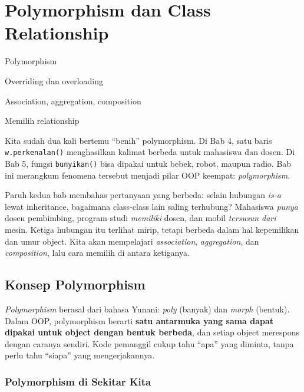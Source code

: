 \chapter{Polymorphism dan Class Relationship}

\begin{dibabini}
  \item Polymorphism
  \item Overriding dan overloading
  \item Association, aggregation, composition
  \item Memilih relationship
\end{dibabini}

Kita sudah dua kali bertemu ``benih'' polymorphism. Di Bab 4, satu baris \texttt{w.perkenalan()} menghasilkan kalimat berbeda untuk mahasiswa dan dosen. Di Bab 5, fungsi \texttt{bunyikan()} bisa dipakai untuk bebek, robot, maupun radio. Bab ini merangkum fenomena tersebut menjadi pilar OOP keempat: \emph{polymorphism}.

Paruh kedua bab membahas pertanyaan yang berbeda: selain hubungan \emph{is-a} lewat inheritance, bagaimana class-class lain saling terhubung? Mahasiswa \emph{punya} dosen pembimbing, program studi \emph{memiliki} dosen, dan mobil \emph{tersusun dari} mesin. Ketiga hubungan itu terlihat mirip, tetapi berbeda dalam hal kepemilikan dan umur object. Kita akan mempelajari \emph{association}, \emph{aggregation}, dan \emph{composition}, lalu cara memilih di antara ketiganya.

\section{Konsep Polymorphism}

\emph{Polymorphism} berasal dari bahasa Yunani: \emph{poly} (banyak) dan \emph{morph} (bentuk). Dalam OOP, polymorphism berarti \textbf{satu antarmuka yang sama dapat dipakai untuk object dengan bentuk berbeda}, dan setiap object merespons dengan caranya sendiri. Kode pemanggil cukup tahu ``apa'' yang diminta, tanpa perlu tahu ``siapa'' yang mengerjakannya.

\subsection{Polymorphism di Sekitar Kita}

